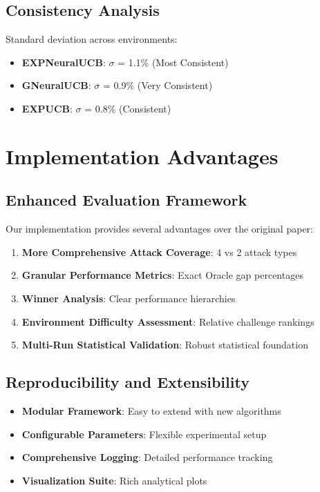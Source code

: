 \documentclass[11pt,a4paper]{article}
\begin{document}
\subsection{Consistency Analysis}

Standard deviation across environments:
\begin{itemize}
    \item \textbf{EXPNeuralUCB}: $\sigma$ = 1.1\% (Most Consistent)
    \item \textbf{GNeuralUCB}: $\sigma$ = 0.9\% (Very Consistent)
    \item \textbf{EXPUCB}: $\sigma$ = 0.8\% (Consistent)
\end{itemize}

\section{Implementation Advantages}

\subsection{Enhanced Evaluation Framework}

Our implementation provides several advantages over the original paper:

\begin{enumerate}
    \item \textbf{More Comprehensive Attack Coverage}: 4 vs 2 attack types
    \item \textbf{Granular Performance Metrics}: Exact Oracle gap percentages
    \item \textbf{Winner Analysis}: Clear performance hierarchies
    \item \textbf{Environment Difficulty Assessment}: Relative challenge rankings
    \item \textbf{Multi-Run Statistical Validation}: Robust statistical foundation
\end{enumerate}

\subsection{Reproducibility and Extensibility}

\begin{itemize}
    \item \textbf{Modular Framework}: Easy to extend with new algorithms
    \item \textbf{Configurable Parameters}: Flexible experimental setup
    \item \textbf{Comprehensive Logging}: Detailed performance tracking
    \item \textbf{Visualization Suite}: Rich analytical plots
\end{itemize}
\end{document}
